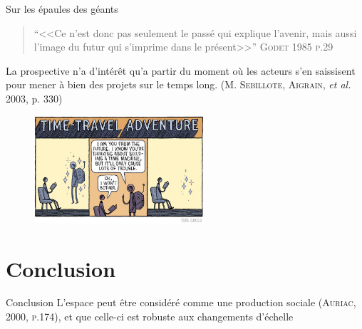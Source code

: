 \documentclass[newPxFont]{beamer}
\begin{document}
\begin{frame}[c]{Sur les épaules des géants}
\vspace{-2em}
\begin{quote}
  \enquote{<<Ce n'est donc pas seulement le passé qui explique l'avenir, mais aussi l'image du futur qui s'imprime dans le présent>>}
  \hspace*{\fill}\textsc{Godet 1985 p.29}
\end{quote}
La prospective n'a d'intérêt qu'a partir du moment où les acteurs s'en saissisent pour mener à bien des projets sur le temps long. (\textsc{M. Sebillote, Aigrain}, \textit{et al.} 2003, p. 330)
\begin{figure}
 \includegraphics[height=4cm]{img/a_thom_gauld_futureMachine.jpg}
\end{figure}
\end{frame}

%
%
\section{Conclusion}

\begin{frame}[c]{Conclusion}
\vspace{-2em}
L'espace peut être considéré comme une production sociale (\textsc{Auriac, 2000, p.174}), et que celle-ci est robuste aux changements d'échelle
\end{frame}
\end{document}
